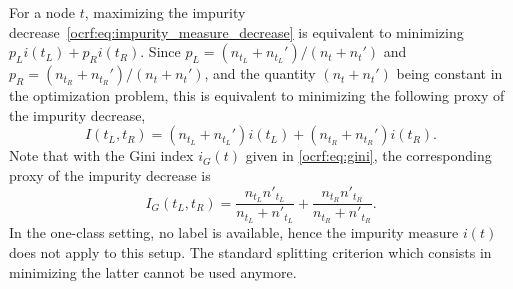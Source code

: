 For a node $t$, maximizing the impurity
decrease~\cref{ocrf:eq:impurity_measure_decrease} is equivalent to minimizing
$p_L i(t_L) + p_R i(t_R)$.  Since $p_L = (n_{t_L} + n_{t_L}') / (n_t + n_t')$
and $p_R = (n_{t_R} + n_{t_R}')/(n_t + n_t')$, and the quantity $(n_t + n_t')$
being constant in the optimization problem, this is equivalent to minimizing
the following proxy of the impurity decrease,
\begin{dmath}
    \label{ocrf:eq:two_class_proxy}
    I(t_L, t_R) =   (n_{t_L} + n_{t_L}') i(t_L) + (n_{t_R} + n_{t_R}') i(t_R).
\end{dmath}
Note that with the Gini index $i_G(t)$ given in \cref{ocrf:eq:gini}, the
corresponding proxy of the impurity decrease is
\begin{dmath}
    \label{ocrf:tc_proxy}
    I_G(t_L, t_R)= \frac{n_{t_L} n'_{t_L}}{n_{t_L} +  n'_{t_L}} + \frac{n_{t_R}
    n'_{t_R}}{n_{t_R} +  n'_{t_R}}.
\end{dmath}
%
In the one-class setting, no label is available, hence the impurity measure
$i(t)$ 
does not apply to this setup. The standard splitting criterion which consists
in minimizing the latter cannot be used anymore.




